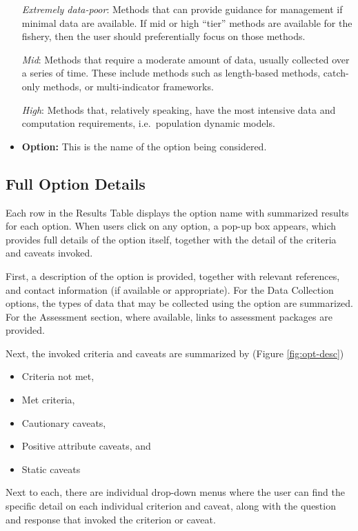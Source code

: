 \documentclass[
  11pt,
]{book}
\providecommand{\tightlist}{%
  \setlength{\itemsep}{0pt}\setlength{\parskip}{0pt}}
\begin{document}
\begin{itemize}
  \emph{Extremely data-poor}: Methods that can provide guidance for management if minimal data are available. If mid or high ``tier'' methods are available for the fishery, then the user should preferentially focus on those methods.

  \emph{Mid}: Methods that require a moderate amount of data, usually collected over a series of time. These include methods such as length-based methods, catch-only methods, or multi-indicator frameworks.

  \emph{High}: Methods that, relatively speaking, have the most intensive data and computation requirements, i.e.~population dynamic models.
\item
  \textbf{Option:} This is the name of the option being considered.
\end{itemize}

\hypertarget{full-option-details}{%
\subsection{Full Option Details}\label{full-option-details}}

Each row in the Results Table displays the option name with summarized results for each option. When users click on any option, a pop-up box appears, which provides full details of the option itself, together with the detail of the criteria and caveats invoked.

First, a description of the option is provided, together with relevant references, and contact information (if available or appropriate). For the Data Collection options, the types of data that may be collected using the option are summarized. For the Assessment section, where available, links to assessment packages are provided.

Next, the invoked criteria and caveats are summarized by (Figure \ref{fig:opt-desc})

\begin{itemize}
\tightlist
\item
  Criteria not met,
\item
  Met criteria,
\item
  Cautionary caveats,
\item
  Positive attribute caveats, and
\item
  Static caveats
\end{itemize}

Next to each, there are individual drop-down menus where the user can find the specific detail on each individual criterion and caveat, along with the question and response that invoked the criterion or caveat.
\end{document}
